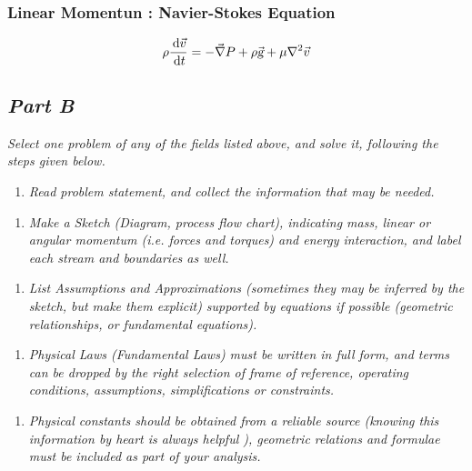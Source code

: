 \documentclass{article}
\newcommand{\ud}{\,\mathrm{d}}
\begin{document}
\subsubsection*{Linear Momentun : Navier-Stokes Equation}

\begin{equation}
\rho \frac{\ud \vec{v}}{\ud t} = - \vec{\nabla} P + \rho \vec{\textsl{g}} + \mu \nabla^2 \vec{v}
\end{equation}

\subsection*{\emph{Part B}}
\textit{Select one problem of any of the fields listed above, and solve it, following the steps given below.}

\begin{enumerate}
\item \textit{Read problem statement, and collect the information that may be needed.}
\end{enumerate}



\begin{enumerate}[resume]
\item \textit{Make a Sketch (Diagram, process flow chart), indicating mass, linear or angular momentum (i.e. forces and torques) and energy interaction, and label each stream and boundaries as well.}
\end{enumerate}



\begin{enumerate}[resume]
\item \textit{List Assumptions and Approximations (sometimes they may be inferred by the sketch, but make them explicit) supported by equations if possible (geometric relationships, or fundamental equations).}
\end{enumerate}



\begin{enumerate}[resume]
\item \textit{Physical Laws (Fundamental Laws) must be written in full form, and terms can be dropped by the right selection of frame of reference, operating conditions, assumptions, simplifications or constraints.}
\end{enumerate}



\begin{enumerate}[resume]
\item \textit{Physical constants should be obtained from a reliable source (knowing this information by heart is always helpful ), geometric relations and formulae must be included as part of your analysis.}
\end{enumerate}
\end{document}
